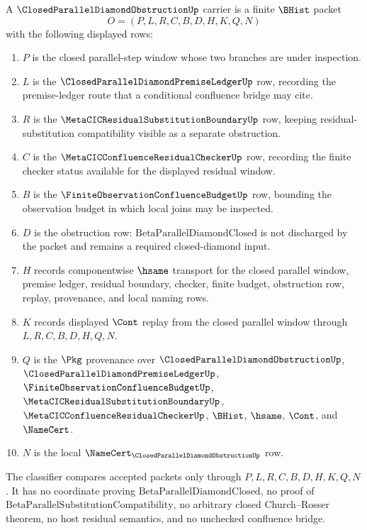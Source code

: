 \begin{definition}
\label{def:closed-parallel-diamond-obstruction-carrier}
A $\ClosedParallelDiamondObstructionUp$ carrier is a finite $\BHist$ packet
$$
O=(P,L,R,C,B,D,H,K,Q,N)
$$
with the following displayed rows:
\begin{enumerate}
\item $P$ is the closed parallel-step window whose two branches are under inspection.
\item $L$ is the $\ClosedParallelDiamondPremiseLedgerUp$ row, recording the premise-ledger route that a conditional confluence bridge may cite.
\item $R$ is the $\MetaCICResidualSubstitutionBoundaryUp$ row, keeping residual-substitution compatibility visible as a separate obstruction.
\item $C$ is the $\MetaCICConfluenceResidualCheckerUp$ row, recording the finite checker status available for the displayed residual window.
\item $B$ is the $\FiniteObservationConfluenceBudgetUp$ row, bounding the observation budget in which local joins may be inspected.
\item $D$ is the obstruction row: $\mathrm{BetaParallelDiamondClosed}$ is not discharged by the packet and remains a required closed-diamond input.
\item $H$ records componentwise $\hsame$ transport for the closed parallel window, premise ledger, residual boundary, checker, finite budget, obstruction row, replay, provenance, and local naming rows.
\item $K$ records displayed $\Cont$ replay from the closed parallel window through $L,R,C,B,D,H,Q,N$.
\item $Q$ is the $\Pkg$ provenance over $\ClosedParallelDiamondObstructionUp$, $\ClosedParallelDiamondPremiseLedgerUp$, $\FiniteObservationConfluenceBudgetUp$, $\MetaCICResidualSubstitutionBoundaryUp$, $\MetaCICConfluenceResidualCheckerUp$, $\BHist$, $\hsame$, $\Cont$, and $\NameCert$.
\item $N$ is the local $\NameCert_{\ClosedParallelDiamondObstructionUp}$ row.
\end{enumerate}
The classifier compares accepted packets only through $P,L,R,C,B,D,H,K,Q,N$. It has no coordinate proving $\mathrm{BetaParallelDiamondClosed}$, no proof of $\mathrm{BetaParallelSubstitutionCompatibility}$, no arbitrary closed Church--Rosser theorem, no host residual semantics, and no unchecked confluence bridge.
\end{definition}

